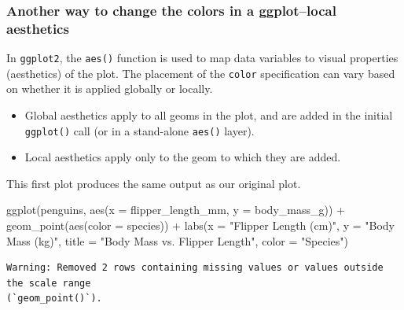\documentclass[
  letterpaper,
  DIV=11,
  numbers=noendperiod]{scrreprt}
\newenvironment{Shaded}{\begin{snugshade}}{\end{snugshade}}
\newcommand{\AttributeTok}[1]{\textcolor[rgb]{0.40,0.45,0.13}{#1}}
\newcommand{\FunctionTok}[1]{\textcolor[rgb]{0.28,0.35,0.67}{#1}}
\newcommand{\NormalTok}[1]{\textcolor[rgb]{0.00,0.23,0.31}{#1}}
\newcommand{\SpecialCharTok}[1]{\textcolor[rgb]{0.37,0.37,0.37}{#1}}
\newcommand{\StringTok}[1]{\textcolor[rgb]{0.13,0.47,0.30}{#1}}
\begin{document}
\hypertarget{another-way-to-change-the-colors-in-a-ggplotlocal-aesthetics}{%
\subsubsection{Another way to change the colors in a ggplot--local
aesthetics}\label{another-way-to-change-the-colors-in-a-ggplotlocal-aesthetics}}

In \texttt{ggplot2}, the \texttt{aes()} function is used to map data
variables to visual properties (aesthetics) of the plot. The placement
of the \texttt{color} specification can vary based on whether it is
applied globally or locally.

\begin{itemize}
\item
  Global aesthetics apply to all geoms in the plot, and are added in the
  initial \texttt{ggplot()} call (or in a stand-alone \texttt{aes()}
  layer).
\item
  Local aesthetics apply only to the geom to which they are added.
\end{itemize}

This first plot produces the same output as our original plot.

\begin{Shaded}
\begin{Highlighting}[]
\FunctionTok{ggplot}\NormalTok{(penguins, }\FunctionTok{aes}\NormalTok{(}\AttributeTok{x =}\NormalTok{ flipper\_length\_mm, }\AttributeTok{y =}\NormalTok{ body\_mass\_g)) }\SpecialCharTok{+}
  \FunctionTok{geom\_point}\NormalTok{(}\FunctionTok{aes}\NormalTok{(}\AttributeTok{color =}\NormalTok{ species)) }\SpecialCharTok{+}
  \FunctionTok{labs}\NormalTok{(}\AttributeTok{x =} \StringTok{"Flipper Length (cm)"}\NormalTok{, }\AttributeTok{y =} \StringTok{"Body Mass (kg)"}\NormalTok{,}
       \AttributeTok{title =} \StringTok{"Body Mass vs. Flipper Length"}\NormalTok{,}
       \AttributeTok{color =} \StringTok{"Species"}\NormalTok{)}
\end{Highlighting}
\end{Shaded}

\begin{verbatim}
Warning: Removed 2 rows containing missing values or values outside the scale range
(`geom_point()`).
\end{verbatim}
\end{document}
